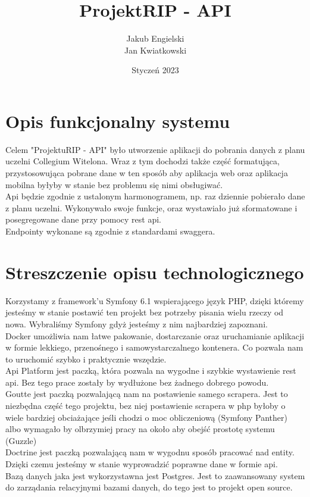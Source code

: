 \documentclass{article}
\title{Projekt\textunderscore RIP - API}
\author{
Jakub Engielski\\
Jan Kwiatkowski \\
}
\date{Styczeń 2023}
\begin{document}
\maketitle

\section{Opis funkcjonalny systemu}
Celem "Projektu\textunderscore RIP - API" było utworzenie aplikacji do pobrania danych z planu uczelni Collegium Witelona. Wraz z tym dochodzi także część formatująca, przystosowująca pobrane dane w ten sposób aby aplikacja web oraz aplikacja mobilna byłyby w stanie bez problemu się nimi obsługiwać.
\\Api będzie zgodnie z ustalonym harmonogramem, np. raz dziennie pobierało dane z planu uczelni. Wykonywało swoje funkcje, oraz wystawiało już sformatowane i posegregowane dane przy pomocy rest api.
\\Endpointy wykonane są zgodnie z standardami swaggera. 


\section{Streszczenie opisu technologicznego}
Korzystamy z framework'u Symfony 6.1 wspierającego język PHP, dzięki któremy jesteśmy w stanie postawić ten projekt bez potrzeby pisania wielu rzeczy od nowa. Wybraliśmy Symfony gdyż jesteśmy z nim najbardziej zapoznani. \\
Docker umożliwia nam łatwe pakowanie, dostarczanie oraz uruchamianie aplikacji w formie lekkiego, przenośnego i samowystarczalnego kontenera. Co pozwala nam to uruchomić szybko i praktycznie wszędzie.
\\
Api Platform jest paczką, która pozwala na wygodne i szybkie wystawienie rest api. Bez tego prace zostały by wydłużone bez żadnego dobrego powodu. 
\\
Goutte jest paczką pozwalającą nam na postawienie samego scrapera. Jest to niezbędna część tego projektu, bez niej postawienie scrapera w php byłoby o wiele bardziej obciażające jeśli chodzi o moc obliczeniową (Symfony Panther) albo wymagało by olbrzymiej pracy na około aby obejść prostotę systemu (Guzzle)
\\
Doctrine jest paczką pozwalającą nam w wygodnu sposób pracować nad entity. Dzięki czemu jesteśmy w stanie wyprowadzić poprawne dane w formie api.
\\
Bazą danych jaka jest wykorzystawna jest Postgres. Jest to zaawansowany system do zarządania relacyjnymi bazami danych, do tego jest to projekt open source.
\end{document}
